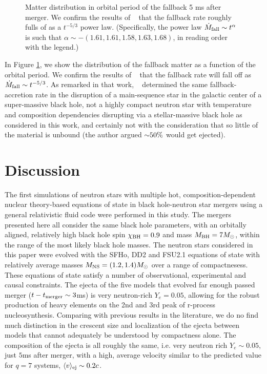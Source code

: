 \begin{figure}
	\centering
	
	\caption[Rate of fallback matter depletion]{
		Matter distribution in orbital period of the fallback 5 ms after merger.  We confirm the results of ~\cite{Chawla:2010sw} that the fallback rate roughly fulls of as a $t^{-5/3}$ power law.  (Specifically, the power law $\dot{M}_{\rm fall} \sim t^{\alpha}$ is such that $\alpha \sim -(1.61,1.61,1.58,1.63,1.68)$, in reading order with the legend.)
	}
	\label{fig:fallback}
\end{figure}

In Figure \ref{fig:fallback}, we show the distribution of the fallback matter as a function of the orbital period.  We confirm the results of ~\cite{Chawla:2010sw} that the fallback rate will fall off as $\dot{M}_{\rm fall} \sim t^{-5/3}$.  As remarked in that work, ~\cite{phinney1989manifestations} determined the same fallback-accretion rate in the disruption of a main-sequence star in the galactic center of a super-massive black hole, not a highly compact neutron star with temperature and composition dependencies disrupting via a stellar-massive black hole as considered in this work, and certainly not with the consideration that so little of the material is unbound (the author argued $\mathord{\sim} 50\%$ would get ejected).


\section{Discussion}
\label{sec:discussion}

The first simulations of neutron stars with multiple hot, composition-dependent nuclear theory-based equations of state in black hole-neutron star mergers using a general relativistic fluid code were performed in this study.  
The mergers presented here all consider the same black hole parameters, with an orbitally aligned, relatively high black hole spin $\chi_{\rm BH} = 0.9$ and  mass $M_{\rm BH} = 7 M_\odot$, within the range of the most likely black hole masses.  
The neutron stars considered in this paper were evolved with the SFHo, DD2 and FSU2.1 equations of state with relatively average masses $M_{\rm NS} = (1.2,1.4) M_\odot$ over a range of compactnesess.  
These equations of state satisfy a number of observational, experimental and causal constraints.  
The ejecta of the five models that evolved far enough passed merger ($t - t_{\rm merger} \sim 3$ms) is very neutron-rich $Y_e = 0.05$, allowing for the robust production of heavy elements on the 2nd and 3rd peak of r-process nucleosynthesis.
Comparing with previous results in the literature, we do no find much distinction in the crescent size and localization of the ejecta between models that cannot adequately be understood by compactness alone.  The composition of the ejecta is all roughly the same, i.e. very neutron rich $Y_e \sim 0.05$, just $5$ms after merger, with a high, average velocity similar to the predicted value for $q=7$ systems, $\langle v \rangle_{\rm ej} \sim 0.2 c$.

